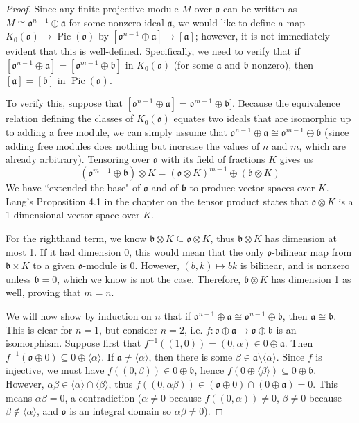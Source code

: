 \documentclass[10pt]{article}
\renewcommand{\a}{\mathfrak{a}}
\renewcommand{\b}{\mathfrak{b}}
\renewcommand{\o}{\mathfrak{o}}
\newcommand{\gen}[1]{\langle #1 \rangle}
\DeclareMathOperator*{\Pic}{Pic}
\begin{document}
\begin{enumerate}
\begin{enumerate}
\begin{proof}
Since any finite projective module $M$ over $\o$ can be written as $M \cong \o^{n-1} \oplus \a$ for some nonzero ideal $\a$, we would like to define a map $K_0(\o) \rightarrow \Pic(\o)$ by $[\o^{n-1} \oplus \a] \mapsto [\a]$; however, it is not immediately evident that this is well-defined.  Specifically, we need to verify that if $[\o^{n-1} \oplus \a] = [\o^{m-1} \oplus \b]$ in $K_0(\o)$ (for some $\a$ and $\b$ nonzero), then $[\a] = [\b]$ in $\Pic(\o)$.

To verify this, suppose that $[\o^{n-1} \oplus \a] = \o^{m-1} \oplus \b]$.  Because the equivalence relation defining the classes of $K_0(\o)$ equates two ideals that are isomorphic up to adding a free module, we can simply assume that $\o^{n-1} \oplus \a \cong \o^{m-1} \oplus \b$ (since adding free modules does nothing but increase the values of $n$ and $m$, which are already arbitrary).  Tensoring over $\o$ with its field of fractions $K$ gives us
$$
(\o^{m-1} \oplus \b) \otimes K = (\o \otimes K)^{m-1} \oplus (\b \otimes K)
$$
We have ``extended the base" of $\o$ and of $\b$ to produce vector spaces over $K$.  Lang's Proposition 4.1 in the chapter on the tensor product states that $\o \otimes K$ is a 1-dimensional vector space over $K$.

For the righthand term, we know $\b \otimes K \subseteq \o \otimes K$, thus $\b \otimes K$ has dimension at most 1.  If it had dimension $0$, this would mean that the only $\o$-bilinear map from $\b \times K$ to a given $\o$-module is $0$.  However, $(b,k) \mapsto bk$ is bilinear, and is nonzero unless $\b = 0$, which we know is not the case.  Therefore, $\b \otimes K$ has dimension 1 as well, proving that $m = n$.

We will now show by induction on $n$ that if $\o^{n-1} \oplus \a \cong \o^{n-1} \oplus \b$, then $\a \cong \b$.  This is clear for $n = 1$, but consider $n=2$, i.e. $f: \o \oplus \a \rightarrow \o \oplus \b$ is an isomorphism.  Suppose first that $f^{-1}((1,0)) = (0,\alpha) \in 0 \oplus \a$.  Then $f^{-1}(\o \oplus 0) \subseteq 0 \oplus \gen{\alpha}$.  If $\a \neq \gen{\alpha}$, then there is some $\beta \in \a \setminus \gen{\alpha}$.  Since $f$ is injective, we must have $f((0,\beta)) \in 0 \oplus \b$, hence $f(0 \oplus \gen{\beta}) \subseteq 0 \oplus \b$.  However, $\alpha\beta \in \gen{\alpha} \cap \gen{\beta}$, thus $f((0,\alpha\beta)) \in (\o \oplus 0) \cap (0 \oplus \a) = 0$.  This means $\alpha\beta = 0$, a contradiction ($\alpha \neq 0$ because $f((0,\alpha)) \neq 0$, $\beta \neq 0$ because $\beta \not \in \gen{\alpha}$, and $\o$ is an integral domain so $\alpha \beta \neq 0$).


\end{proof}
\end{enumerate}
\end{enumerate}
\end{document}
